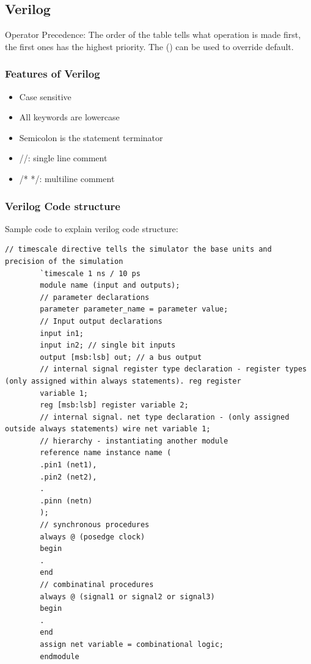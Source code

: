 \subsection{Verilog}
Operator Precedence:
The order of the table tells what operation is made first, the first ones has the highest priority. The () can be used to override default. 
\subsubsection{Features of Verilog}
\begin{itemize}
	\item Case sensitive
	\item All keywords are lowercase
	\item Semicolon is the statement terminator
	\item //: single line comment
	\item /* */: multiline comment
\end{itemize} 


\subsubsection{Verilog Code structure}
Sample code to explain verilog code structure:
    \begin{lstlisting}[style={verilog-style}]
        // timescale directive tells the simulator the base units and precision of the simulation 
        `timescale 1 ns / 10 ps 
        module name (input and outputs); 
        // parameter declarations 
        parameter parameter_name = parameter value; 
        // Input output declarations 
        input in1; 
        input in2; // single bit inputs 
        output [msb:lsb] out; // a bus output 
        // internal signal register type declaration - register types (only assigned within always statements). reg register
        variable 1; 
        reg [msb:lsb] register variable 2; 
        // internal signal. net type declaration - (only assigned outside always statements) wire net variable 1; 
        // hierarchy - instantiating another module 
        reference name instance name ( 
        .pin1 (net1), 
        .pin2 (net2), 
        . 
        .pinn (netn) 
        ); 
        // synchronous procedures 
        always @ (posedge clock) 
        begin 
        . 
        end 
        // combinatinal procedures 
        always @ (signal1 or signal2 or signal3) 
        begin 
        . 
        end 
        assign net variable = combinational logic; 
        endmodule 
    \end{lstlisting}
  
